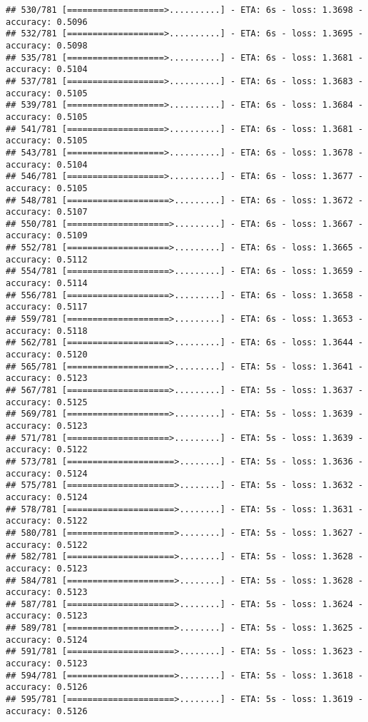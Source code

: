 \documentclass[
]{article}
\begin{document}
\begin{verbatim}
## 530/781 [===================>..........] - ETA: 6s - loss: 1.3698 - accuracy: 0.5096
## 532/781 [===================>..........] - ETA: 6s - loss: 1.3695 - accuracy: 0.5098
## 535/781 [===================>..........] - ETA: 6s - loss: 1.3681 - accuracy: 0.5104
## 537/781 [===================>..........] - ETA: 6s - loss: 1.3683 - accuracy: 0.5105
## 539/781 [===================>..........] - ETA: 6s - loss: 1.3684 - accuracy: 0.5105
## 541/781 [===================>..........] - ETA: 6s - loss: 1.3681 - accuracy: 0.5105
## 543/781 [===================>..........] - ETA: 6s - loss: 1.3678 - accuracy: 0.5104
## 546/781 [===================>..........] - ETA: 6s - loss: 1.3677 - accuracy: 0.5105
## 548/781 [====================>.........] - ETA: 6s - loss: 1.3672 - accuracy: 0.5107
## 550/781 [====================>.........] - ETA: 6s - loss: 1.3667 - accuracy: 0.5109
## 552/781 [====================>.........] - ETA: 6s - loss: 1.3665 - accuracy: 0.5112
## 554/781 [====================>.........] - ETA: 6s - loss: 1.3659 - accuracy: 0.5114
## 556/781 [====================>.........] - ETA: 6s - loss: 1.3658 - accuracy: 0.5117
## 559/781 [====================>.........] - ETA: 6s - loss: 1.3653 - accuracy: 0.5118
## 562/781 [====================>.........] - ETA: 6s - loss: 1.3644 - accuracy: 0.5120
## 565/781 [====================>.........] - ETA: 5s - loss: 1.3641 - accuracy: 0.5123
## 567/781 [====================>.........] - ETA: 5s - loss: 1.3637 - accuracy: 0.5125
## 569/781 [====================>.........] - ETA: 5s - loss: 1.3639 - accuracy: 0.5123
## 571/781 [====================>.........] - ETA: 5s - loss: 1.3639 - accuracy: 0.5122
## 573/781 [=====================>........] - ETA: 5s - loss: 1.3636 - accuracy: 0.5124
## 575/781 [=====================>........] - ETA: 5s - loss: 1.3632 - accuracy: 0.5124
## 578/781 [=====================>........] - ETA: 5s - loss: 1.3631 - accuracy: 0.5122
## 580/781 [=====================>........] - ETA: 5s - loss: 1.3627 - accuracy: 0.5122
## 582/781 [=====================>........] - ETA: 5s - loss: 1.3628 - accuracy: 0.5123
## 584/781 [=====================>........] - ETA: 5s - loss: 1.3628 - accuracy: 0.5123
## 587/781 [=====================>........] - ETA: 5s - loss: 1.3624 - accuracy: 0.5123
## 589/781 [=====================>........] - ETA: 5s - loss: 1.3625 - accuracy: 0.5124
## 591/781 [=====================>........] - ETA: 5s - loss: 1.3623 - accuracy: 0.5123
## 594/781 [=====================>........] - ETA: 5s - loss: 1.3618 - accuracy: 0.5126
## 595/781 [=====================>........] - ETA: 5s - loss: 1.3619 - accuracy: 0.5126

\end{verbatim}
\end{document}
